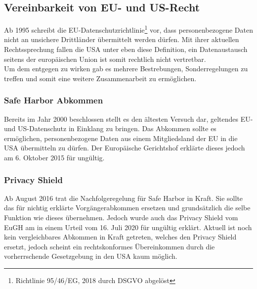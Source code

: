 \subsection{Vereinbarkeit von EU- und US-Recht}
    Ab 1995 schreibt die EU-Datenschutzrichtlinie\footnote{Richtlinie 95/46/EG, 2018 durch DSGVO abgelöst} vor, dass personenbezogene Daten nicht an unsichere Drittländer übermittelt werden dürfen. Mit ihrer aktuellen Rechtssprechung fallen die USA unter eben diese Definition, ein Datenaustausch seitens der europäischen Union ist somit rechtlich nicht vertretbar.\\
    Um dem entgegen zu wirken gab es mehrere Bestrebungen, Sonderregelungen zu treffen und somit eine weitere Zusammenarbeit zu ermöglichen.\\

\subsubsection{Safe Harbor Abkommen}
    Bereits im Jahr 2000 beschlossen stellt es den ältesten Versuch dar, geltendes EU- und US-Datenschutz in Einklang zu bringen. Das Abkommen sollte es ermöglichen, personenbezogene Daten aus einem Mitgliedsland der EU in die USA übermitteln zu dürfen. Der Europäische Gerichtshof erklärte dieses jedoch am 6. Oktober 2015 für ungültig.\\

\subsubsection{Privacy Shield}
    Ab August 2016 trat die Nachfolgeregelung für Safe Harbor in Kraft. Sie sollte das für nichtig erklärte Vorgängerabkommen ersetzen und grundsätzlich die selbe Funktion wie dieses übernehmen. Jedoch wurde auch das Privacy Shield vom EuGH am in einem Urteil vom 16. Juli 2020 für ungültig erklärt. Aktuell ist noch kein vergleichbares Abkommen in Kraft getreten, welches den Privacy Shield ersetzt, jedoch scheint ein rechtskonformes Übereinkommen durch die vorherrschende Gesetzgebung in den USA kaum möglich.
\vfill